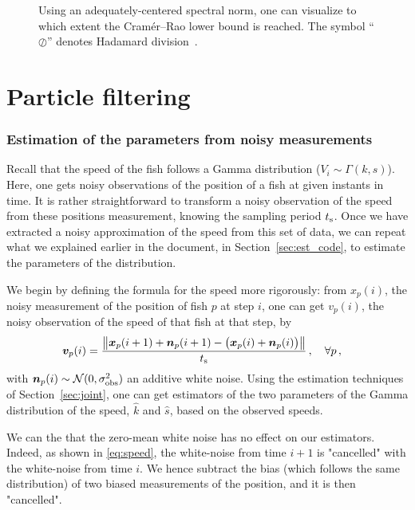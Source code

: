 \documentclass[final]{aomart}
\newtheorem[{}\it]{thm}{Theorem}[section]
\theoremstyle{definition}
\newtheorem*[{}\it]{notation}{Notation}
\numberwithin{equation}{section}
\newcommand{\ts}{t_\textnormal{s}}
\newcommand{\enVert}[1]{\left\lVert#1\right\rVert}
\let\norm=\enVert
\begin{document}
\begin{figure}[!htbp]
	\centering
	\scalebox{0.75}{}
	\caption{Using an adequately-centered spectral norm, one can visualize to which extent the Cramér--Rao lower bound is reached.
	The symbol ``\(\oslash\)'' denotes Hadamard division~\cite{wiki:hadamard}.}
	\label{fig:CRLB}
\end{figure}

\part{Particle filtering}

\section{Estimation of the parameters from noisy measurements}
Recall that the speed of the fish follows a Gamma distribution (\(V_i \sim \Gamma(k, s)\)).
Here, one gets noisy observations of the position of a fish at given instants in time.
It is rather straightforward to transform a noisy observation of the speed from these positions measurement, knowing the sampling period \(\ts\).
Once we have extracted a noisy approximation of the speed from this set of data, we can repeat what we explained earlier in the document, in Section~\ref{sec:est_code}, to estimate the parameters of the distribution.

We begin by defining the formula for the speed more rigorously: from \(x_p(i)\), the noisy measurement of the position of fish \(p\) at step $i$, one can get \(v_p(i)\), the noisy observation of the speed of that fish at that step, by
\begin{align}
	\bm{v}_p(i) &= \frac{\norm{\bm{x}_p(i+1) + \bm{n}_p(i+1) - \big(\bm{x}_p(i) + \bm{n}_p(i)\big)}}{\ts}\,, \quad \forall p\,,\label{eq:speed}
\end{align}
with \(\bm{n}_p(i) \sim \mathcal{N}(0, \sigma^2_{\textnormal{obs}})\) an additive white noise.
Using the estimation techniques of Section~\ref{sec:joint}, one can get estimators of the two parameters of the Gamma distribution of the speed, \(\hat{k}\) and \(\hat{s}\), based on the observed speeds.

We can the that the zero-mean white noise has no effect on our estimators. Indeed, as shown in \eqref{eq:speed}, the white-noise from time \(i+1\) is "cancelled" with the white-noise from time \(i\). We hence subtract the bias (which follows the same distribution) of two biased measurements of the position, and it is then "cancelled".
\end{document}

